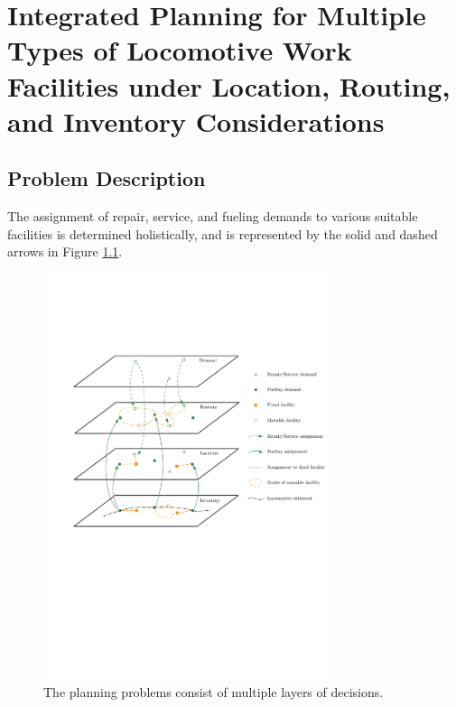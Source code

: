 

\chapter{Integrated Planning for Multiple Types of Locomotive Work Facilities under Location, Routing, and Inventory Considerations}\label{chap:locomotive}



\section{Problem Description}\label{sec:locomotive:problem}

The assignment of repair, service, and fueling demands to various suitable facilities is determined holistically, and is represented by the solid and dashed arrows in Figure \ref{fig:locomotive:problem}.
\begin{figure}[!ht]
  \centering
    \includegraphics[width=0.75\textwidth]{images_locomotive/Figure1.pdf}
  \caption{The planning problems consist of multiple layers of decisions.} 
  \label{fig:locomotive:problem}
\end{figure}



